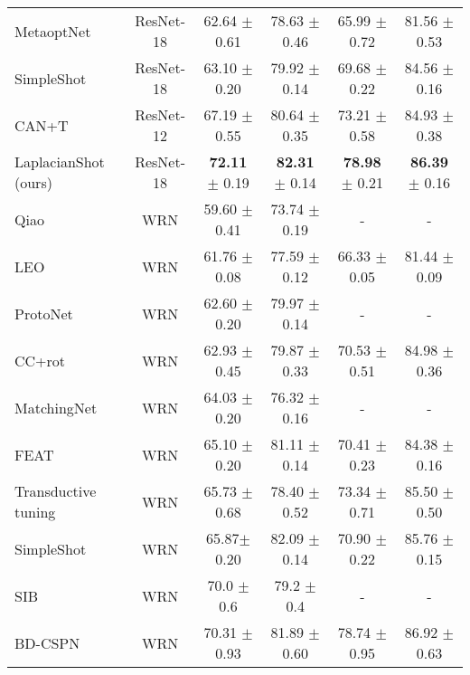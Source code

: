 \documentclass{article}
\begin{document}
\begin{table*}[t]
\begin{center}
\begin{small}
\begin{tabular}{lc|cc|cc}
MetaoptNet \cite{lee2019meta}  & ResNet-18 & 62.64 $\pm$ 0.61 & 78.63 $\pm$ 0.46&65.99 $\pm$ 0.72 & 81.56 $\pm$ 0.53\\
SimpleShot \cite{wang2019simpleshot}& ResNet-18 & 63.10 $\pm$ 0.20 & 79.92 $\pm$ 0.14& 69.68 $\pm$ 0.22 & 84.56 $\pm$ 0.16\\
CAN+T \cite{can}& ResNet-12 & 67.19 $\pm$ 0.55 & 80.64 $\pm$ 0.35& 73.21 $\pm$ 0.58 & 84.93 $\pm$ 0.38\\
\rowcolor{Gray}
LaplacianShot (ours) & ResNet-18 & \textbf{72.11} $\pm$ 0.19 & \textbf{82.31} $\pm$ 0.14& \textbf{78.98} $\pm$ 0.21 & \textbf{86.39} $\pm$ 0.16\\
\hline
Qiao \cite{qiao2018few}  & WRN & 59.60 $\pm$ 0.41 & 73.74 $\pm$ 0.19&-&-\\
LEO \cite{rusu2018metalearning} & WRN & 61.76 $\pm$ 0.08 &77.59 $\pm$ 0.12& 66.33 $\pm$ 0.05 & 81.44 $\pm$ 0.09\\
ProtoNet \cite{snell2017prototypical} & WRN & 62.60 $\pm$ 0.20 & 79.97 $\pm$ 0.14&-&-\\
CC+rot \cite{gidaris2019boosting}  & WRN & 62.93 $\pm$ 0.45 & 79.87 $\pm$ 0.33& 70.53 $\pm$ 0.51 & 84.98 $\pm$ 0.36\\
MatchingNet \cite{Vinyals2016MatchingNF} & WRN & 64.03 $\pm$ 0.20 & 76.32 $\pm$ 0.16&-&-\\
FEAT \cite{ye2020fewshot} & WRN & 65.10 $\pm$ 0.20 & 81.11 $\pm$ 0.14& 70.41 $\pm$ 0.23 & 84.38 $\pm$ 0.16\\
Transductive tuning \cite{Dhillon2020A} & WRN & 65.73 $\pm$ 0.68 & 78.40 $\pm$ 0.52& 73.34 $\pm$ 0.71 & 85.50 $\pm$ 0.50\\
SimpleShot \cite{wang2019simpleshot}& WRN & 65.87$\pm$ 0.20 & 82.09 $\pm$ 0.14& 70.90 $\pm$ 0.22 & 85.76 $\pm$ 0.15\\
SIB  \cite{hu2020empirical} & WRN & 70.0 $\pm$ 0.6 & 79.2 $\pm$ 0.4&-&-\\
BD-CSPN \cite{liu2019prototype} & WRN & 70.31 $\pm$ 0.93 & 81.89 $\pm$ 0.60& 78.74 $\pm$ 0.95 & 86.92 $\pm$ 0.63\\


\end{tabular}
\end{small}
\end{center}
\end{table*}
\end{document}
